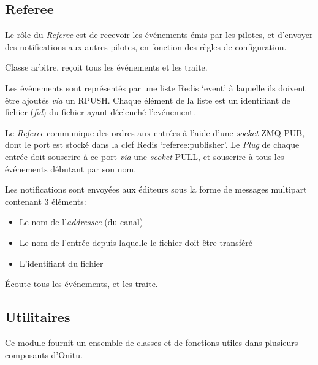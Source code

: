 \documentclass[letterpaper,10pt,english]{sphinxmanual}
\begin{document}
\subsection{Referee}
\label{components:referee}
Le rôle du \emph{Referee} est de recevoir les événements émis par les pilotes, et d'envoyer des notifications aux autres pilotes, en fonction des règles de configuration.

\begin{fulllineitems}
\label{components:onitu.referee.Referee}
Classe arbitre, reçoit tous les événements et les traite.

Les événements sont représentés par une liste Redis `event' à laquelle ils doivent être ajoutés \emph{via} un RPUSH. Chaque élément de la liste est un identifiant de fichier (\emph{fid}) du fichier ayant déclenché l'evénement.

Le \emph{Referee} communique des ordres aux entrées à l'aide d'une \emph{socket} ZMQ PUB, dont le port est stocké dans la clef Redis `referee:publisher'. Le \emph{Plug} de chaque entrée doit souscrire à ce port \emph{via} une \emph{scoket} PULL, et souscrire à tous les événements débutant par son nom.

Les notifications sont envoyées aux éditeurs sous la forme de messages multipart contenant 3 éléments:
\begin{itemize}
\item {} 
Le nom de l'\emph{addressee} (du canal)

\item {} 
Le nom de l'entrée depuis laquelle le fichier doit être transféré

\item {} 
L'identifiant du fichier

\end{itemize}

\begin{fulllineitems}
\label{components:onitu.referee.Referee.listen}
Écoute tous les événements, et les traite.

\end{fulllineitems}


\end{fulllineitems}



\subsection{Utilitaires}
\label{components:utils}\label{components:module-onitu.utils}
Ce module fournit un ensemble de classes et de fonctions utiles dans plusieurs composants d'Onitu.
\end{document}
